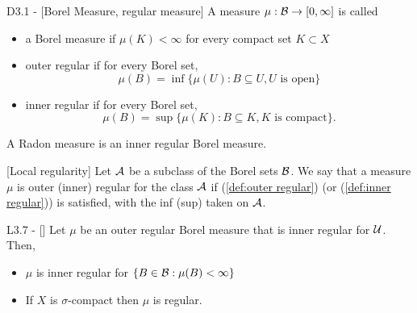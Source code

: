 \documentclass{article}
\begin{document}
\begin{flexidefinition}{D3.1 - }[Borel Measure, regular measure]
A measure $\mu : \mathcal{B} \to [0, \infty]$ is called
\begin{itemize}
    \item a Borel measure if $\mu(K) < \infty$ for every compact set $K \subset X$
    \item outer regular if for every Borel set,
    \begin{equation}\label{def:outer regular}
        \mu(B) = \inf \{\mu(U) : B \subseteq U, U \text{ is open} \}
    \end{equation}
    \item inner regular if for every Borel set,
    \begin{equation}\label{def:inner regular}
        \mu(B) = \sup \{\mu(K) : B \subseteq K, K \text{ is compact} \}.
    \end{equation}
\end{itemize}
A Radon measure is an inner regular Borel measure.
\end{flexidefinition}
\begin{flexidefinition}{}[Local regularity]
    Let $\mathcal{A}$ be a subclass of the Borel sets $\mathcal{B}$. We say that a measure $\mu$ is outer (inner) regular for the class $\mathcal{A}$ if (\ref{def:outer regular}) (or (\ref{def:inner regular})) is satisfied, with the inf (sup) taken on $\mathcal{A}$.
\end{flexidefinition}
\begin{flexilemma}{L3.7 - }[]
    Let $\mu$ be an outer regular Borel measure that is inner regular for $\mathcal{U}$. Then,
    \begin{itemize}
        \item $\mu$ is inner regular for $\{ B \in \mathcal{B} : \mu(B) < \infty \}$
        \item If $X$ is $\sigma$-compact then $\mu$ is regular.
    \end{itemize}
\end{flexilemma}
\end{document}
